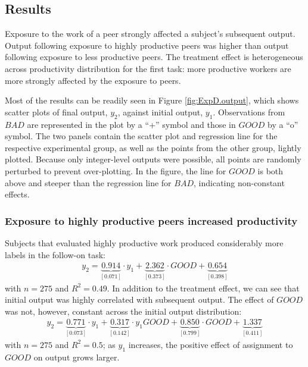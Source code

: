 \documentclass[12pt]{article}
\begin{document}
\subsection{Results} 
Exposure to the work of a peer strongly affected a subject's
subsequent output. Output following exposure to highly productive
peers was higher than output following exposure to less productive
peers.  The treatment effect is heterogeneous across productivity
distribution for the first task: more productive workers are more
strongly affected by the exposure to peers.

Most of the results can be readily seen in Figure
\ref{fig:ExpD.output}, which shows scatter plots of final output,
$y_2$, against initial output, $y_1$. Observations from $BAD$ are
represented in the plot by a ``+'' symbol and those in $GOOD$ by a
``o'' symbol. The two panels contain the scatter plot and regression
line for the respective experimental group, as well as the points from
the other group, lightly plotted.  Because only integer-level outputs
were possible, all points are randomly perturbed to prevent
over-plotting. In the figure, the line for $GOOD$ is both above and
steeper than the regression line for $BAD$, indicating non-constant
effects.


\subsubsection{Exposure to highly productive peers increased productivity}
Subjects that evaluated highly productive work produced considerably more
labels in the follow-on task: 
\begin{align}
  y_2 = \underbrace{0.914}_{[0.071]} \cdot y_1 +  
 \underbrace{2.362}_{[0.373]} \cdot GOOD + 
  \underbrace{0.654}_{[0.398]}  
\end{align}
with $n = 275$ and $R^2 = 0.49$. In
addition to the treatment effect, we can see that initial output was
highly correlated with subsequent output. The effect of $GOOD$ was
not, however, constant across the initial output distribution:
\begin{align}y_2 = \underbrace{0.771}_{[0.073]} \cdot y_1 +  
\underbrace{0.317}_{[0.142]} \cdot y_1GOOD +
\underbrace{0.850}_{[0.799]} \cdot GOOD +
\underbrace{1.337}_{[0.411]}
\end{align} 
with $n =275$ and $R^2 = 0.5$; as $y_1$ increases, the
positive effect of assignment to $GOOD$ on output grows larger.
\end{document}
